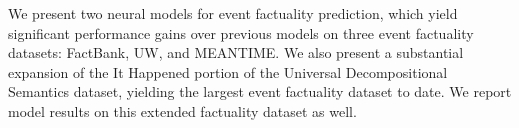 We present two neural models for event factuality prediction, which yield significant performance gains over previous models on three event factuality datasets: FactBank, UW, and MEANTIME. We also present a substantial expansion of the It Happened portion of the Universal Decompositional Semantics dataset, yielding the largest event factuality dataset to date. We report model results on this extended factuality dataset as well.
